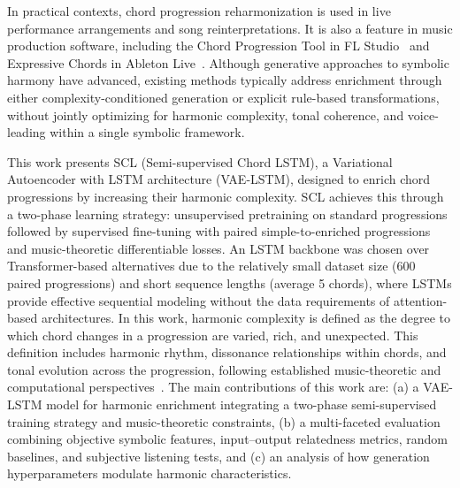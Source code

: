\documentclass[conference]{IEEEtran}
\begin{document}
In practical contexts, chord progression reharmonization is used in live performance arrangements and song reinterpretations. It is also a feature in music production software, including the Chord Progression Tool in FL Studio~\cite{flstudio_manual} and Expressive Chords in Ableton Live~\cite{ableton_expressive_chords}. Although generative approaches to symbolic harmony have advanced, existing methods typically address enrichment through either complexity-conditioned generation or explicit rule-based transformations, without jointly optimizing for harmonic complexity, tonal coherence, and voice-leading within a single symbolic framework.

This work presents SCL (Semi-supervised Chord LSTM), a Variational Autoencoder with LSTM architecture (VAE-LSTM), designed to enrich chord progressions by increasing their harmonic complexity. SCL achieves this through a two-phase learning strategy: unsupervised pretraining on standard progressions followed by supervised fine-tuning with paired simple-to-enriched progressions and music-theoretic differentiable losses. An LSTM backbone was chosen over Transformer-based alternatives due to the relatively small dataset size (600 paired progressions) and short sequence lengths (average 5 chords), where LSTMs provide effective sequential modeling without the data requirements of attention-based architectures. In this work, harmonic complexity is defined as the degree to which chord changes in a progression are varied, rich, and unexpected. This definition includes harmonic rhythm, dissonance relationships within chords, and tonal evolution across the progression, following established music-theoretic and computational perspectives~\cite{rohrmeier2012comparing,temperley2004cognition}. The main contributions of this work are: (a) a VAE-LSTM model for harmonic enrichment integrating a two-phase semi-supervised training strategy and music-theoretic constraints, (b) a multi-faceted evaluation combining objective symbolic features, input--output relatedness metrics, random baselines, and subjective listening tests, and (c) an analysis of how generation hyperparameters modulate harmonic characteristics.
\end{document}
